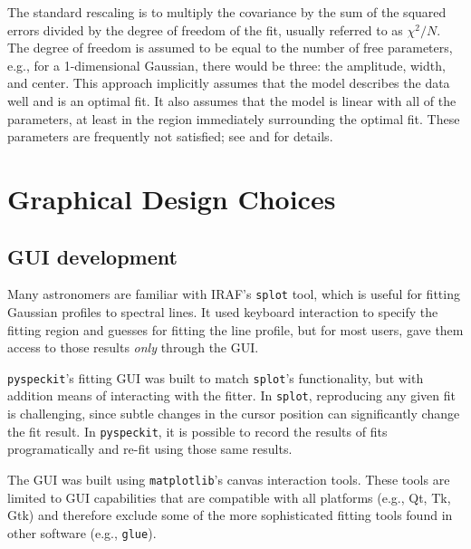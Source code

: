 \documentclass[twocolumn]{aastex61}
\newcommand{\pyspeckit}{\texttt{pyspeckit}\xspace}
\begin{document}
The standard rescaling is to multiply the covariance by the sum of the squared
errors divided by the degree of freedom of the fit, usually referred to
as $\chi^2/N$.  The degree of freedom is assumed to be equal to the number
of free parameters, e.g., for a 1-dimensional Gaussian, there would be three:
the amplitude, width, and center.  This approach implicitly assumes that the
model describes the data well and is an optimal fit.  It also assumes that
the model is linear with all of the parameters, at least in the region immediately
surrounding the optimal fit.  These parameters are frequently not satisfied;
see \citet{Andrae2010a} and \citet{Andrae2010b} for details.




\section{Graphical Design Choices}
\label{sec:gui}
\subsection{GUI development}
Many astronomers are familiar with IRAF's \texttt{splot} tool, which is useful
for fitting Gaussian profiles to spectral lines.  It used keyboard interaction
to specify the fitting region and guesses for fitting the line profile, but for
most users, gave them access to those results \emph{only} through the GUI.

\texttt{pyspeckit}'s fitting GUI was built to match \texttt{splot}'s
functionality, but with addition means of interacting with the fitter.  In
\texttt{splot}, reproducing any given fit is challenging, since subtle changes
in the cursor position can significantly change the fit result.  In \pyspeckit,
it is possible to record the results of fits programatically and re-fit using
those same results.

The GUI was built using \texttt{matplotlib}'s canvas interaction tools.  These
tools are limited to GUI capabilities that are compatible with all platforms
(e.g., Qt, Tk, Gtk) and therefore exclude some of the more sophisticated fitting
tools found in other software (e.g., \texttt{glue}).
\end{document}
